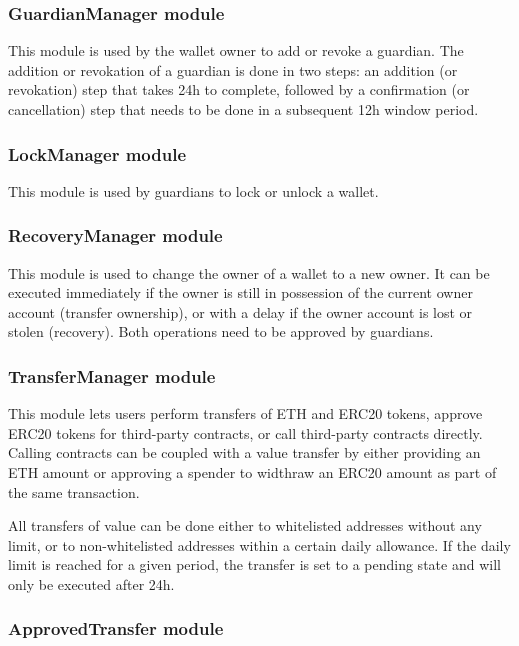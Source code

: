 \documentclass[12pt]{article}
\begin{document}
\subsubsection{GuardianManager module}

This module is used by the wallet owner to add or revoke a guardian. The addition or revokation of a guardian is done in two steps: an addition (or revokation) step that takes 24h to complete, followed by a confirmation (or cancellation) step that needs to be done in a subsequent 12h window period.

\subsubsection{LockManager module}

This module is used by guardians to lock or unlock a wallet.

\subsubsection{RecoveryManager module}

This module is used to change the owner of a wallet to a new owner. It can be executed immediately if the owner is still in possession of the current owner account (transfer ownership), or with a delay if the owner account is lost or stolen (recovery). Both operations need to be approved by guardians.

\subsubsection{TransferManager module}

This module lets users perform transfers of ETH and ERC20 tokens, approve ERC20 tokens for third-party contracts, or call third-party contracts directly. Calling contracts can be coupled with a value transfer by either providing an ETH amount or approving a spender to widthraw an ERC20 amount as part of the same transaction.

All transfers of value can be done either to whitelisted addresses without any limit, or to non-whitelisted addresses within a certain daily allowance. If the daily limit is reached for a given period, the transfer is set to a pending state and will only be executed after 24h.

\subsubsection{ApprovedTransfer module}
\end{document}
